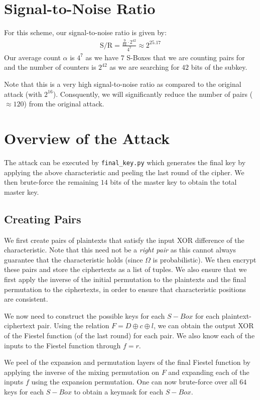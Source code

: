 \documentclass[12pt]{article}
\begin{document}
\section{Signal-to-Noise Ratio}
For this scheme, our signal-to-noise ratio is given by:
\begin{align*}
  \text{S/R} = \frac{\frac{9}{64} \cdot 2^{42}}{4^7} \approx 2^{25.17}
\end{align*}
Our average count $\alpha$ is $4^7$ as we have $7$ S-Boxes that we are counting pairs for and the number of counters is $2^{42}$ as we are searching for $42$ bits of the subkey.

Note that this is a very high signal-to-noise ratio as compared to the original attack (with $2^{16}$). Consquently, we will significantly reduce the number of pairs ($\approx 120$) from the original attack.

\section{Overview of the Attack}
The attack can be executed by \texttt{final\_key.py} which generates the final key by applying the above characteristic and peeling the last round of the cipher. We then brute-force the remaining $14$ bits of the master key to obtain the total master key.

\subsection{Creating Pairs}
We first create pairs of plaintexts that satisfy the input XOR difference of the characteristic. Note that this need not be a \emph{right pair} as this cannot always guarantee that the characteristic holds (since $\Omega$ is probabilistic). We then encrypt these pairs and store the ciphertexts as a list of tuples. We also ensure that we first apply the inverse of the initial permutation to the plaintexts and the final permutation to the ciphertexts, in order to ensure that characteristic positions are consistent.

We now need to construct the possible keys for each $S-Box$ for each plaintext-ciphertext pair. Using the relation $F = D \oplus c \oplus l$, we can obtain the output XOR of the Fiestel function (of the last round) for each pair. We also know each of the inputs to the Fiestel function through $f = r$.

We peel of the expansion and permutation layers of the final Fiestel function by applying the inverse of the mixing permutation on $F$ and expanding each of the inputs $f$ using the expansion permutation. One can now brute-force over all $64$ keys for each $S-Box$ to obtain a keymask for each $S-Box$.
\end{document}
